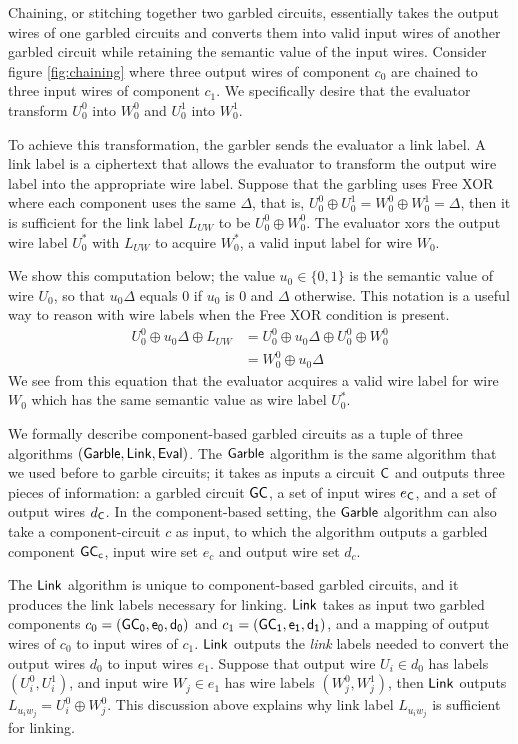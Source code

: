 Chaining, or stitching together two garbled circuits, essentially takes the output wires of one garbled circuits and converts them into valid input wires of another garbled circuit while retaining the semantic value of the input wires.
Consider figure \ref{fig:chaining} where three output wires of component $c_0$ are chained to three input wires of component $c_1$. 
We specifically desire that the evaluator transform $U_0^0$ into $W_0^0$ and $U_0^1$ into $W_0^1$. 

To achieve this transformation, the garbler sends the evaluator a link label.
A link label is a ciphertext that allows the evaluator to transform the output wire label into the appropriate wire label. 
Suppose that the garbling uses Free XOR where each component uses the same $\Delta$, that is, $U_0^0 \oplus U_0^1 = W_0^0 \oplus W_0^1 = \Delta$, then it is sufficient for the link label $L_{UW}$ to be $U_0^0 \oplus W_0^0$.
The evaluator xors the output wire label $U_0^*$ with $L_{UW}$ to acquire $W_0^*$, a valid input label for wire $W_0$. 

We show this computation below; the value $u_0 \in \{0,1\}$ is the semantic value of wire $U_0$, so that $u_0\Delta$ equals $0$ if $u_0$ is $0$ and $\Delta$ otherwise. 
This notation is a useful way to reason with wire labels when the Free XOR condition is present. 
\begin{align}
	U_0^0 \oplus u_0 \Delta \oplus L_{UW} & = U_0^0 \oplus u_0 \Delta \oplus U_0^0 \oplus W_0^0 \\
	& = W_0^0 \oplus u_0 \Delta
\end{align}
We see from this equation that the evaluator acquires a valid wire label for wire $W_0$ which has the same semantic value as wire label $U_0^*$.



We formally describe component-based garbled circuits as a tuple of three algorithms $(\sf{Garble}, \sf{Link}, \sf{Eval})$.
The $\sf{Garble}$ algorithm is the same algorithm that we used before to garble circuits; it takes as inputs a circuit $\sf {C}$ and outputs three pieces of information: a garbled circuit $\sf {GC}$, a set of input wires $e_{\sf {C}}$, and a set of output wires $d_{\sf {C}}$.
In the component-based setting, the $\sf{Garble}$ algorithm can also take a component-circuit $c$ as input, to which the algorithm outputs a garbled component $\sf {GC}_c$, input wire set $e_c$ and output wire set $d_c$. 

The $\sf{Link}$ algorithm is unique to component-based garbled circuits, and it produces the link labels necessary for linking.
$\sf{Link}$ takes as input two garbled components $c_0 = (\sf {GC}_0, e_0, d_0)$ and $c_1 = (\sf {GC}_1, e_1, d_1)$, and a mapping of output wires of $c_0$ to input wires of $c_1$. 
$\sf{Link}$ outputs the \textit{link} labels needed to convert the output wires $d_0$ to input wires $e_1$. 
Suppose that output wire $U_i \in d_0$ has labels $(U_i^0, U_i^1)$, and input wire $W_j \in e_1$ has wire labels $(W_j^0, W_j^1)$, then $\sf{Link}$ outputs $L_{u_i w_j} = U_i^0 \oplus W_j^0$. 
This discussion above explains why link label $L_{u_i w_j}$ is sufficient for linking. 

